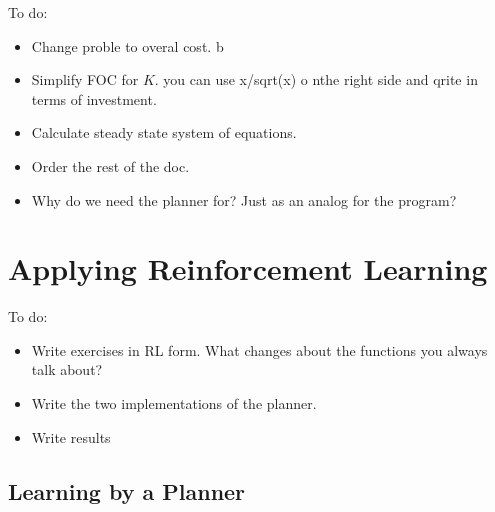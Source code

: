 \documentclass[11pt,english]{article}
\begin{document}
\begin{itemize}
	{\color{red} To do: 
		\begin{itemize}
			\item Change proble to overal cost.  b
			\item Simplify FOC for $K$. you can use x/sqrt(x) o nthe right side and qrite in terms of investment.
			\item Calculate steady state system of equations. 
			\item Order the rest of the doc.
			\item Why do we need the planner for? Just as an analog for the program?
	\end{itemize}}
	
\end{itemize}

\section{Applying Reinforcement Learning}

{\color{red} To do: 
	
	\begin{itemize}
		\item Write exercises in RL form. What changes about the functions you always talk about?  
		\item Write the two implementations of the planner. 
		\item Write results
\end{itemize}}


\subsection{Learning by a Planner}
\end{document}
